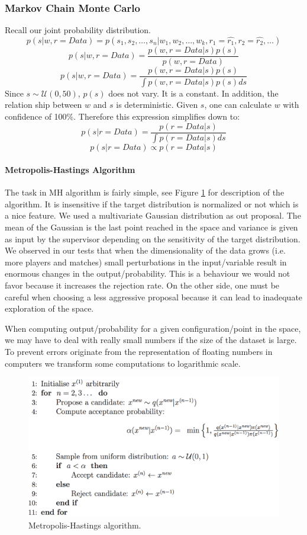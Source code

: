 \documentclass[12pt]{article}
\begin{document}
\subsubsection{Markov Chain Monte Carlo}
Recall our joint probability distribution.
$$p(s | w, r=Data) = p(s_1, s_2, \dots, s_n | w_1, w_2, \dots, w_k, r_1=\hat{r_1}, r_2=\hat{r_2}, \dots)$$
$$p(s | w, r=Data) = \frac{p(w,r=Data | s)p(s)}{p(w, r=Data)}$$
$$p(s | w, r=Data) = \frac{p(w,r=Data | s)p(s)}{\int p(w, r=Data | s) p(s) ds}$$
Since $s \sim \mathcal{U}(0,50)$, $p(s)$ does not vary. It is a constant. In addition, the relation ship between $w$ and $s$ is deterministic. Given $s$, one can calculate $w$  with confidence of 100\%. Therefore this expression simplifies down to:
$$p(s | r=Data) = \frac{p(r=Data | s)}{\int p(r=Data | s) ds}$$
$$p(s | r=Data) \propto p(r=Data | s)$$

\newpage

\paragraph{Metropolis-Hastings Algorithm}
The task in MH algorithm is fairly simple, see Figure \ref*{mh} for description of the algorithm. It is insensitive if the target distribution is normalized or not which is a nice feature. We used a multivariate Gaussian distribution as out proposal. The mean of the Gaussian is the last point reached in the space and variance is given as input by the supervisor depending on the sensitivity of the target distribution. We observed in our tests that when the dimensionality of the data grows (i.e. more players and matches) small perturbations in the input/variable result in enormous changes in the output/probability. This is a behaviour we would not favor because it increases the rejection rate. On the other side, one must be careful when choosing a less aggressive proposal because it can lead to inadequate exploration of the space.

When computing output/probability for a given configuration/point in the space, we may have to deal with really small numbers if the size of the dataset is large. To prevent errors originate from the representation of floating numbers in computers we transform some computations to logarithmic scale.

\begin{figure}[!ht]
	\centering
	\includegraphics[width=1\columnwidth]{mh}
	\caption{Metropolis-Hastings algorithm.}
	\label{mh}
\end{figure}
\end{document}
